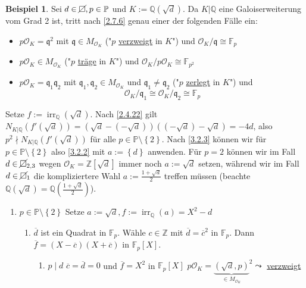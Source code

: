 \documentclass[
twoside=semi,
fontsize=12,
DIV=12, 
cleardoublepage=current,
leqno,
headings=optiontoheadandtoc, 
toc=idx
]{scrbook}
\newcommand{\Z}{\mathbb{Z}}
\newcommand{\Q}{\mathbb{Q}}
\newcommand{\F}{\mathbb{F}}
\renewcommand{\P}{\mathbb{P}}
\newcommand{\nsquare}{\cancel{\square}}
\newcommand{\set}[1]{\left\{ #1 \right\}}
\DeclareMathOperator{\irr}{irr}
\theoremstyle{definition}
\newtheorem{beispiel}[definition]{Beispiel}
\begin{document}
	\begin{beispiel}\label{3.2.4}\hfill\newline
		Sei $d\in \nsquare, p \in \P$ und $K:= \Q(\sqrt{d})$. Da $K|\Q$ eine Galoiserweiterung vom Grad 2 ist, tritt nach \ref{2.7.6} genau einer der folgenden F\"alle ein:
		\begin{itemize}
			\item $p\mathcal{O}_K = \mathfrak{q}^2$ mit $\mathfrak{q} \in M_{\mathcal{O}_K}$ ("$p$ \underline{verzweigt} in $K$") und $\mathcal{O}_K/\mathfrak{q} \cong \F_p$
			\item $p\mathcal{O}_K \in M_{\mathcal{O}_K}$ ("$p$ \underline{tr\"age} in $K$") und $\mathcal{O}_K/p\mathcal{O}_K \cong \F_{p^2}$
			\item $p\mathcal{O}_K = \mathfrak{q}_1\mathfrak{q}_2$ mit $\mathfrak{q}_1, \mathfrak{q}_2 \in M_{\mathcal{O}_K}$ und $\mathfrak{q}_1 \neq \mathfrak{q}_2$ ("$p$ \underline{zerlegt} in $K$") und 
				\[\mathcal{O}_K/\mathfrak{q}_1 \cong \mathcal{O}_K/\mathfrak{q}_2 \cong \F_p\]
		\end{itemize}
		Setze $f:= \irr_\Q(\sqrt{d})$. \newline 
		Nach \ref{2.4.22} gilt $N_{K|\Q}(f'(\sqrt{d})) = (\sqrt{d} - (-\sqrt{d}))((-\sqrt{d}) -\sqrt{d}) = -4d$, also $p^2\nmid N_{K|\Q}(f'(\sqrt{d}))$ f\"ur alle $p \in \P \setminus \set{2}$.
		Nach \ref{3.2.3} k\"onnen wir f\"ur $p \in \P\setminus \set{2}$ also \ref{3.2.2} mit $a:= \set{d}$ anwenden. F\"ur $p=2$ k\"onnen wir im Fall $d \in \nsquare_{2,3}$ wegen $\mathcal{O}_K = \Z[\sqrt{d}]$ immer noch $a:= \sqrt{d}$ setzen, w\"ahrend wir im Fall $d \in \nsquare_1$ die kompliziertere Wahl $a:= \frac{1+\sqrt{d}}{2}$ treffen m\"ussen (beachte $\Q(\sqrt{d}) = \Q(\frac{1+\sqrt{d}}{2})$).
		
		\begin{enumerate}[label = \underline{Fall \arabic*}]
			\item $p \in \P \setminus \set{2}$\newline
			Setze $a:= \sqrt{d}, f:= \irr_\Q(a) = X^2-d$
			\begin{enumerate}[label = \underline{Fall 1.\arabic*}]
				\item $\overline{d}$ ist ein Quadrat in $\F_p$.\newline
				W\"ahle $c \in \Z$ mit $\overline{d} = \overline{c}^2$ in $\F_p$. Dann $\overline{f} = (X-\overline{c})(X+\overline{c})$ in $\F_p[X]$.
				\begin{enumerate}[label = \underline{Fall 1.1.\arabic*}]
					\item $p\mid d$\newline
					$\overline{c} = \overline{d} = 0$ und $\overline{f} = X^2$ in $\F_p[X]$\newline
					$p\mathcal{O}_K = {\underbrace{(\sqrt{d}, p)}_{\in M_{\mathcal{O}_K}}}^2 \leadsto$ \underline{verzweigt}
					

\end{enumerate}
\end{enumerate}
\end{enumerate}
\end{beispiel}
\end{document}

